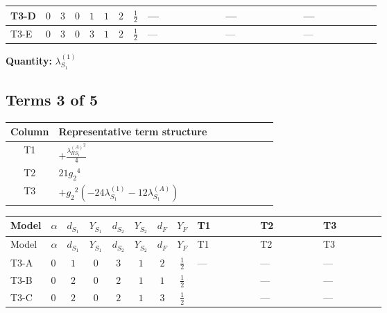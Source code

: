 \documentclass[8pt]{article}
\begin{document}
\begin{landscape}
\begin{longtable}{@{}llcccccc >{\raggedright\arraybackslash}p{0.21\linewidth} >{\raggedright\arraybackslash}p{0.21\linewidth} >{\raggedright\arraybackslash}p{0.21\linewidth}@{}}
\midrule
T3-D & $0$ & $3$ & $0$ & $1$ & $1$ & $2$ & $\frac{1}{2}$ & --- & --- & --- \\
\midrule
T3-E & $0$ & $3$ & $0$ & $3$ & $1$ & $2$ & $\frac{1}{2}$ & --- & --- & --- \\
\midrule
\bottomrule
\end{longtable}
\clearpage
\noindent\textbf{Quantity: }$\lambda_{S_1}^{(1)}$\par\smallskip
\subsection*{Terms 3 of 5}
\begin{center}
\begin{tabular}{@{}c >{\raggedright\arraybackslash}p{0.82\linewidth}@{}}
\toprule
Column & Representative term structure \\
\midrule
T1 & \(\displaystyle +\frac{{\lambda_{HS_1}^{(A)}}^2}{4}\) \\
\midrule
T2 & \(\displaystyle 21 {g_2}^4\) \\
\midrule
T3 & \(\displaystyle +{g_2}^2 (-24 {\lambda_{S_1}^{(1)}}-12 {\lambda_{S_1}^{(A)}})\) \\
\midrule
\bottomrule
\end{tabular}
\end{center}
\smallskip
\tiny
\begin{longtable}{@{}llcccccc >{\raggedright\arraybackslash}p{0.21\linewidth} >{\raggedright\arraybackslash}p{0.21\linewidth} >{\raggedright\arraybackslash}p{0.21\linewidth}@{}}
\toprule
Model & $\alpha$ & $d_{S_1}$ & $Y_{S_1}$ & $d_{S_2}$ & $Y_{S_2}$ & $d_F$ & $Y_F$ & T1 & T2 & T3 \\
\midrule
\endfirsthead
\toprule
Model & $\alpha$ & $d_{S_1}$ & $Y_{S_1}$ & $d_{S_2}$ & $Y_{S_2}$ & $d_F$ & $Y_F$ & T1 & T2 & T3 \\
\midrule
\endhead
T3-A & $0$ & $1$ & $0$ & $3$ & $1$ & $2$ & $\frac{1}{2}$ & --- & --- & --- \\
\midrule
T3-B & $0$ & $2$ & $0$ & $2$ & $1$ & $1$ & $\frac{1}{2}$ & \scriptsize\adjustbox{max width=\linewidth}{$\begin{gathered} +\frac{{\lambda_{HS_1}^{(A)}}^2}{4}\end{gathered}$} & --- & --- \\
\midrule
T3-C & $0$ & $2$ & $0$ & $2$ & $1$ & $3$ & $\frac{1}{2}$ & \scriptsize\adjustbox{max width=\linewidth}{$\begin{gathered} +\frac{{\lambda_{HS_1}^{(A)}}^2}{4}\end{gathered}$} & --- & --- \\

\end{longtable}
\end{landscape}
\end{document}
